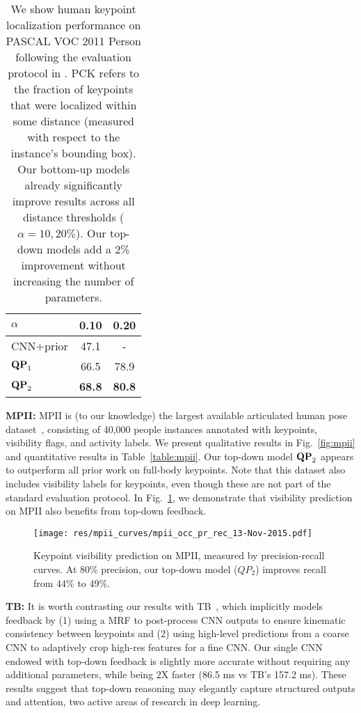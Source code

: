 \documentclass[10pt,twocolumn,letterpaper]{article}
\newcommand{\QP}[1]{{${\bf QP}_{#1}$}}
\begin{document}
\begin{table}
  \centering
    \begin{tabular}{l|c|c}
      $\alpha$                         & 0.10       & 0.20       \\
      \hline \hline
      CNN+prior\cite{long2014convnets} & 47.1       & -          \\
      \hline
      \QP{1}                           & 66.5       & 78.9       \\
      \QP{2}                           & {\bf 68.8} & {\bf 80.8} \\
    \end{tabular}
\caption{We show human keypoint localization performance on PASCAL
      VOC 2011 Person following the evaluation protocol in
      \cite{long2014convnets}. PCK refers to the fraction of keypoints
      that were localized within some distance (measured with respect
      to the instance's bounding box). Our bottom-up models already
      significantly improve results across all distance thresholds
      ($\alpha = 10,20\%$). Our top-down models add a 2\% improvement
      without increasing the number of parameters. }
    \label{table:pascal}
\end{table}

{\bf MPII:} MPII is (to our knowledge) the largest available
articulated human pose dataset~\cite{andriluka14cvpr}, consisting of
40,000 people instances annotated with keypoints, visibility flags,
and activity labels. We present qualitative results in
Fig.~\ref{fig:mpii} and quantitative results in
Table~\ref{table:mpii}. Our top-down model \QP{2} appears to
outperform all prior work on full-body keypoints. Note that this dataset also includes visibility labels for keypoints, even though these are not
part of the standard evaluation protocol. In Fig.~\ref{fig:mpii-occ},
we demonstrate that visibility prediction on MPII also benefits from
top-down feedback.
\begin{figure}[t!]
  \centering
  \texttt{[image: res/mpii\_curves/mpii\_occ\_pr\_rec\_13-Nov-2015.pdf]}
  \caption{Keypoint visibility prediction on MPII, measured by
    precision-recall curves. At 80\% precision, our top-down model ($QP_2$) improves recall from 44\% to 49\%.}
  \label{fig:mpii-occ}
\end{figure}



{\bf TB: } It is worth contrasting our results with TB~\cite{tompson2015efficient}, which implicitly models feedback by (1) using a MRF to post-process CNN outputs to ensure
kinematic consistency between keypoints and (2) using high-level
predictions from a coarse CNN to adaptively crop high-res features for a fine CNN. Our single CNN endowed with
top-down feedback is slightly more accurate without requiring any
additional parameters, while being 2X faster (86.5 ms vs TB's 157.2
ms). These results suggest that top-down reasoning may elegantly
capture structured outputs and attention, two active areas of research
in deep learning.
\end{document}
